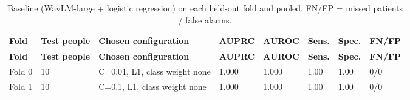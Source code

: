 \documentclass[11pt,a4paper]{article}
\begin{document}
\begin{center}\small\renewcommand{\arraystretch}{1.15}
\begin{longtable}{>{\raggedright\arraybackslash}p{1.28cm}>{\raggedleft\arraybackslash}p{1.55cm}>{\raggedright\arraybackslash}p{2.56cm}>{\raggedleft\arraybackslash}p{1.55cm}>{\raggedleft\arraybackslash}p{1.55cm}>{\raggedleft\arraybackslash}p{1.55cm}>{\raggedleft\arraybackslash}p{1.55cm}>{\raggedleft\arraybackslash}p{1.55cm}}
\caption{Baseline (WavLM-large + logistic regression) on each held-out fold and pooled. FN/FP = missed patients / false alarms.}\\
\toprule
\textbf{\hspace{0pt}Fold} & \textbf{\hspace{0pt}Test people} & \textbf{\hspace{0pt}Chosen configuration} & \textbf{\hspace{0pt}AUPRC} & \textbf{\hspace{0pt}AUROC} & \textbf{\hspace{0pt}Sens.} & \textbf{\hspace{0pt}Spec.} & \textbf{\hspace{0pt}FN/\allowbreak{}FP}\\\midrule\endfirsthead
\toprule
\textbf{\hspace{0pt}Fold} & \textbf{\hspace{0pt}Test people} & \textbf{\hspace{0pt}Chosen configuration} & \textbf{\hspace{0pt}AUPRC} & \textbf{\hspace{0pt}AUROC} & \textbf{\hspace{0pt}Sens.} & \textbf{\hspace{0pt}Spec.} & \textbf{\hspace{0pt}FN/\allowbreak{}FP}\\\midrule\endhead
\bottomrule\endfoot
\hspace{0pt}Fold 0 & \hspace{0pt}10 & \hspace{0pt}C=0.01, L1, class weight none & \hspace{0pt}1.000 & \hspace{0pt}1.000 & \hspace{0pt}1.00 & \hspace{0pt}1.00 & \hspace{0pt}0/\allowbreak{}0\\
\hspace{0pt}Fold 1 & \hspace{0pt}10 & \hspace{0pt}C=0.1, L1, class weight none & \hspace{0pt}1.000 & \hspace{0pt}1.000 & \hspace{0pt}1.00 & \hspace{0pt}1.00 & \hspace{0pt}0/\allowbreak{}0\\

\end{longtable}
\end{center}
\end{document}
